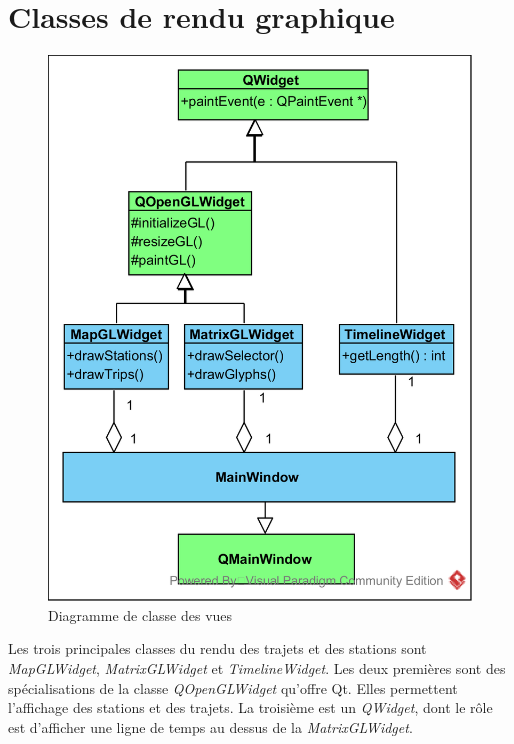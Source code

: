 \documentclass[12pt]{article}
\begin{document}
	\newpage
	\section{Classes de rendu graphique}
	
	\begin{figure}[!h]
	\begin{center}
	\includegraphics[scale=1]{dia_class_rendering.png}
	\caption{Diagramme de classe des vues}
	\label{fig:renduGraphique}
	\end{center}
	\end{figure}
	
	Les trois principales classes du rendu des trajets et des stations sont \textit{MapGLWidget}, \textit{MatrixGLWidget} et \textit{TimelineWidget}. Les deux premières sont des spécialisations de la classe \textit{QOpenGLWidget} qu’offre Qt. Elles permettent l’affichage des stations et des trajets. La troisième est un \textit{QWidget}, dont le rôle est d’afficher une ligne de temps au
dessus de la \textit{MatrixGLWidget}.
	
\end{document}
